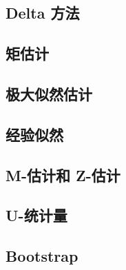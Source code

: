 \documentclass[lang=cn,10pt,scheme=chinese,color=blue,usesamecnt]{asymptoticbook}
\numberwithin{equation}{chapter}
\newcommand{\chapterreferences}{%
  \printbibliography[heading=subbibliography,title={本章参考文献}]%
}
\begin{document}
\begin{refsection}
\chapter{Delta 方法}\label{ch:delta-method}

\nocite{vandervaart1998}
\chapterreferences
\end{refsection}

\begin{refsection}
\chapter{矩估计}\label{ch:method-of-moments}

\nocite{hansen1982,neweymcfadden1994}
\chapterreferences
\end{refsection}

\begin{refsection}
\chapter{极大似然估计}\label{ch:maximum-likelihood}

\nocite{vandervaart1998,serfling1980,shao2003}
\chapterreferences
\end{refsection}

\begin{refsection}
\chapter{经验似然}\label{ch:empirical-likelihood}

\nocite{owen2001,neweysmith2004}
\chapterreferences
\end{refsection}

\begin{refsection}
\chapter{M-估计和 Z-估计}\label{ch:m-and-z-estimation}

\nocite{vandervaart1998,vandervaartwellner1996}
\chapterreferences
\end{refsection}

\begin{refsection}
\chapter{U-统计量}\label{ch:u-statistics}


\nocite{hoeffding1948,serfling1980,lee1990}
\chapterreferences
\end{refsection}

\begin{refsection}
\chapter{Bootstrap}\label{ch:bootstrap}


\nocite{efron1979,efrontibshirani1993,hall1992}
\chapterreferences
\end{refsection}
\end{document}
